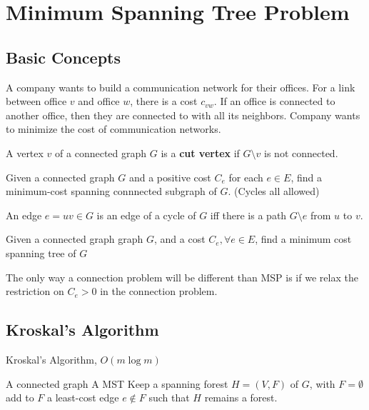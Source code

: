 		\chapter{Minimum Spanning Tree Problem}
			\section{Basic Concepts}
				\begin{example}
					A company wants to build a communication network for their offices. For a link between office $v$ and office $w$, there is a cost $c_{vw}$. If an office is connected to another office, then they are connected to with all its neighbors. Company wants to minimize the cost of communication networks.
				\end{example}

				\begin{definition}
					A vertex $v$ of a connected graph $G$ is a \textbf{cut vertex} if $G\setminus v$ is not connected.
				\end{definition}

				\begin{definition}
					Given a connected graph $G$ and a positive cost $C_e$ for each $e\in E$, find a minimum-cost spanning connnected subgraph of $G$. (Cycles all allowed)
				\end{definition}

				\begin{lemma}
					An edge $e = uv \in G$ is an edge of a cycle of $G$ iff there is a path $G\setminus e$ from $u$ to $v$.
				\end{lemma}

				\begin{definition}
					Given a connected graph graph $G$, and a cost $C_e, \forall e\in E$, find a minimum cost spanning tree of $G$
				\end{definition}

				The only way a connection problem will be different than MSP is if we relax the restriction on $C_e > 0$ in the connection problem.

			\section{Kroskal's Algorithm}
				\begin{algorithm}
					\caption{Kroskal's Algorithm, $O(m \log m)$}
					\begin{algorithmic}
						\Require A connected graph
						\Ensure A MST
						\State Keep a spanning forest $H=(V, F)$ of $G$, with $F=\emptyset$
							\State add to $F$ a least-cost edge $e\notin F$ such that $H$ remains a forest.
						\EndWhile
					\end{algorithmic}
				\end{algorithm}

